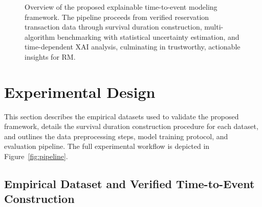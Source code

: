 \documentclass[pdflatex,iicol,sn-mathphys-ay]{sn-jnl}
\theoremstyle{thmstyleone}%
\theoremstyle{thmstyletwo}%
\theoremstyle{thmstylethree}%
\begin{document}
\begin{figure}[htbp]
{
}
\caption{Overview of the proposed explainable time-to-event modeling framework. The pipeline proceeds from verified reservation transaction data through survival duration construction, multi-algorithm benchmarking with statistical uncertainty estimation, and time-dependent XAI analysis, culminating in trustworthy, actionable insights for RM.}\label{fig:framework}
\end{figure}

\section{Experimental Design}
\label{sec:experimental_design}

This section describes the empirical datasets used to validate the proposed framework, details the survival duration construction procedure for each dataset, and outlines the data preprocessing steps, model training protocol, and evaluation pipeline. The full experimental workflow is depicted in Figure~\ref{fig:pipeline}.

\subsection{Empirical Dataset and Verified Time-to-Event Construction}
\label{sec:dataset}
\end{document}
